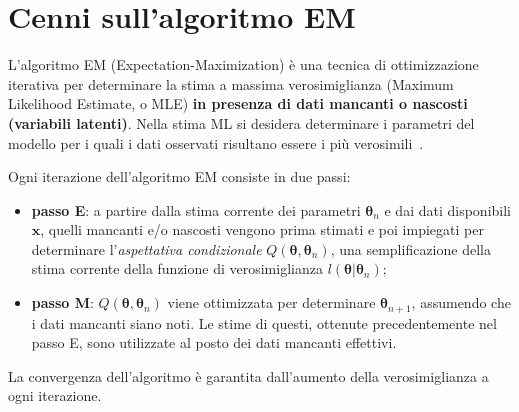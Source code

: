 \section[Cenni sull'algoritmo EM]{Cenni sull'algoritmo EM}
L'algoritmo EM (Expectation-Maximization) è una tecnica di ottimizzazione iterativa per determinare la stima a massima verosimiglianza (Maximum Likelihood Estimate, o MLE) \textbf{in presenza di dati mancanti o nascosti (variabili latenti)}. Nella stima ML si desidera determinare i parametri del modello per i quali i dati osservati risultano essere i più verosimili~\cite{paper_EM_algorithm}. \par Ogni iterazione dell'algoritmo EM consiste in due passi:
\begin{itemize}
	\item \textbf{passo E}: a partire dalla stima corrente dei parametri $\boldsymbol{\theta}_n$ e dai dati disponibili $\mathbf{x}$, quelli mancanti e/o nascosti vengono prima stimati e poi impiegati per determinare l'\textit{aspettativa condizionale} $Q(\boldsymbol{\theta},\boldsymbol{\theta}_n)$, una semplificazione della stima corrente della funzione di verosimiglianza $l(\boldsymbol{\theta}|\boldsymbol{\theta}_n)$;
	\item \textbf{passo M}: $Q(\boldsymbol{\theta},\boldsymbol{\theta}_n)$ viene ottimizzata per determinare $\boldsymbol{\theta}_{n+1}$, assumendo che i dati mancanti siano noti. Le stime di questi, ottenute precedentemente nel passo E, sono utilizzate al posto dei dati mancanti effettivi.
\end{itemize}
La convergenza dell'algoritmo è garantita dall'aumento della verosimiglianza a ogni iterazione.

